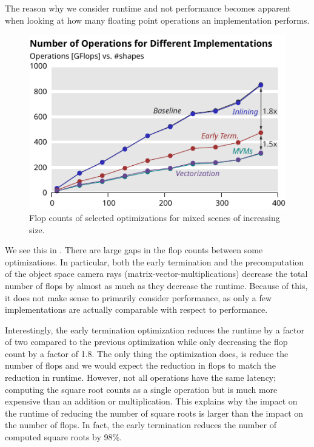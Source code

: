 \documentclass[letterpaper]{article}
\begin{document}
The reason why we consider runtime and not performance becomes apparent when looking at how
many floating point operations an implementation performs.

\begin{figure}[b]
  \centering
  \includegraphics{Figures/rep-all-flops.pdf}
  \caption{Flop counts of selected optimizations for mixed scenes of increasing size.\label{fig:flops-all}}
\end{figure}

We see this in .
There are large gaps in the flop counts between  some optimizations.
In particular, both the early termination and the precomputation of the object space
camera rays (matrix-vector-multiplications) decrease the total number of flops by
almost as much as they decrease the runtime.
Because of this, it does not make sense to primarily consider performance, as only a few
implementations are actually comparable with respect to performance.

Interestingly, the early termination optimization reduces the runtime by a factor 
of two compared to the previous optimization while only decreasing the flop count by a
factor of 1.8.
The only thing the optimization does, is reduce the number of flops and we would expect the
reduction in flops to match the reduction in runtime.
However, not all operations have the same latency; computing the square root counts as a single operation
but is much more expensive than an addition or multiplication.
This explains why the impact on the runtime of reducing the number of square roots is larger than the impact on the number of flops.
In fact, the early termination reduces the number of computed square roots by 98\%.
\end{document}
